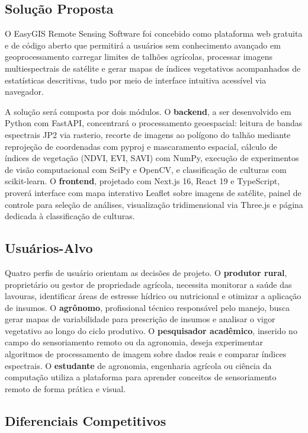 \documentclass[12pt, a4paper]{article}
\begin{document}
\subsection{Solução Proposta}

O EasyGIS Remote Sensing Software foi concebido como plataforma web gratuita e de código aberto que permitirá a usuários sem conhecimento avançado em geoprocessamento carregar limites de talhões agrícolas, processar imagens multiespectrais de satélite e gerar mapas de índices vegetativos acompanhados de estatísticas descritivas, tudo por meio de interface intuitiva acessível via navegador.

A solução será composta por dois módulos. O \textbf{backend}, a ser desenvolvido em Python com FastAPI, concentrará o processamento geoespacial: leitura de bandas espectrais JP2 via rasterio, recorte de imagens ao polígono do talhão mediante reprojeção de coordenadas com pyproj e mascaramento espacial, cálculo de índices de vegetação (NDVI, EVI, SAVI) com NumPy, execução de experimentos de visão computacional com SciPy e OpenCV, e classificação de culturas com scikit-learn. O \textbf{frontend}, projetado com Next.js 16, React 19 e TypeScript, proverá interface com mapa interativo Leaflet sobre imagens de satélite, painel de controle para seleção de análises, visualização tridimensional via Three.js e página dedicada à classificação de culturas.

\subsection{Usuários-Alvo}

Quatro perfis de usuário orientam as decisões de projeto. O \textbf{produtor rural}, proprietário ou gestor de propriedade agrícola, necessita monitorar a saúde das lavouras, identificar áreas de estresse hídrico ou nutricional e otimizar a aplicação de insumos. O \textbf{agrônomo}, profissional técnico responsável pelo manejo, busca gerar mapas de variabilidade para prescrição de insumos e analisar o vigor vegetativo ao longo do ciclo produtivo. O \textbf{pesquisador acadêmico}, inserido no campo do sensoriamento remoto ou da agronomia, deseja experimentar algoritmos de processamento de imagem sobre dados reais e comparar índices espectrais. O \textbf{estudante} de agronomia, engenharia agrícola ou ciência da computação utiliza a plataforma para aprender conceitos de sensoriamento remoto de forma prática e visual.

\subsection{Diferenciais Competitivos}
\end{document}
